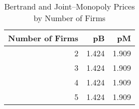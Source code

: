 \begin{table}
\caption{Bertrand and Joint–Monopoly Prices by Number of Firms}
\label{tab:pB_pM_n}
\begin{tabular}{rrr}
\toprule
Number of Firms & pB & pM \\
\midrule
2 & 1.424 & 1.909 \\
3 & 1.424 & 1.909 \\
4 & 1.424 & 1.909 \\
5 & 1.424 & 1.909 \\
\bottomrule
\end{tabular}
\end{table}
